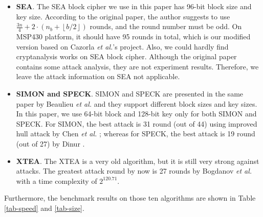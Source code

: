 \documentclass[sigconf, review=false]{acmart}
\begin{document}
\begin{itemize}
    \item
\textbf{SEA}. The SEA \cite{standaert2006sea} block cipher we use in this paper has 96-bit block size and key size.
According to the original paper, the author suggests to use $\frac{3n}{4}+2\cdot (n_{b}+\left \lfloor b/2 \right \rfloor)$ rounds, and the round number must be odd.
On MSP430 platform, it should have 95 rounds in total, which is our modified version based on Cazorla \textit{et al.}'s project.
Also, we could hardly find cryptanalysis works on SEA block cipher.
Although the original paper contains some attack analysis, they are not experiment results. Therefore, we leave the attack information on SEA not applicable.

    \item
\textbf{SIMON and SPECK}. SIMON and SPECK are presented in the same paper by Beaulieu \textit{et al.} \cite{beaulieu2015simon}
and they support different block sizes and key sizes. In this paper, we use 64-bit block and 128-bit key only for both SIMON and SPECK.
For SIMON, the best attack is 31 round (out of 44) using improved hull attack by Chen \textit{et al.} \cite{chen2016improved};
whereas for SPECK, the best attack is 19 round (out of 27) by Dinur \cite{dinur2014improved}.

    \item
\textbf{XTEA}. The XTEA \cite{wheeler1998correction} is a very old algorithm, but it is still very strong against attacks.
The greatest attack round by now is 27 rounds by Bogdanov \textit{et al.} \cite{bogdanov2012zero} with a time complexity of $2^{120.71}$.
\end{itemize}

Furthermore, the benchmark results on those ten algorithms are shown in Table \ref{tab-speed} and \ref{tab-size}.
\end{document}
